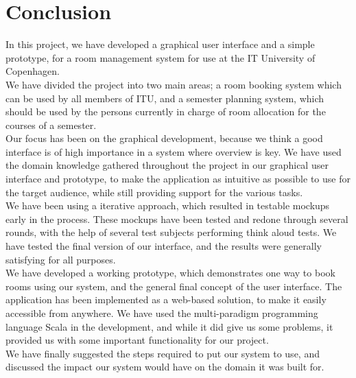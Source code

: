 \chapter{Conclusion}
In this project, we have developed a graphical user interface and a simple prototype, for a room management system for use at the IT University of Copenhagen.\\
We have divided the project into two main areas; a room booking system which can be used by all members of ITU, and a semester planning system, which should be used by the persons currently in charge of room allocation for the courses of a semester.\\
Our focus has been on the graphical development, because we think a good interface is of high importance in a system where overview is key. We have used the domain knowledge gathered throughout the project in our graphical user interface and prototype, to make the application as intuitive as possible to use for the target audience, while still providing support for the various tasks. \\

We have been using a iterative approach, which resulted in testable mockups early in the process. These mockups have been tested and redone through several rounds, with the help of several test subjects performing think aloud tests. We have tested the final version of our interface, and the results were generally satisfying for all purposes.\\

We have developed a working prototype, which demonstrates one way to book rooms using our system, and the general final concept of the user interface. The application has been implemented as a web-based solution, to make it easily accessible from anywhere. We have used the multi-paradigm programming language Scala in the development, and while it did give us some problems, it provided us with some important functionality for our project.\\

We have finally suggested the steps required to put our system to use, and discussed the impact our system would have on the domain it was built for.